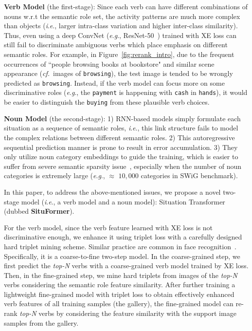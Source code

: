 \documentclass[letterpaper]{article} %
\newcommand{\ie}{\textit{i}.\textit{e}.}
\newcommand{\eg}{\textit{e}.\textit{g}.}
\newcommand{\cf}{\textit{cf.}}
\begin{document}
\noindent\textbf{Verb Model} (the first-stage): Since each verb can have different combinations of nouns w.r.t the semantic role set, the activity patterns are much more complex than objects (\ie, larger intra-class variation and higher inter-class similarity). Thus, even using a deep ConvNet  (\eg, ResNet-50~\cite{he2016deep}) trained with XE loss can still fail to discriminate ambiguous verbs which place emphasis on different semantic roles. For example, in Figure~\ref{fig:rerank_intro}, due to the frequent occurrences of ``people browsing books at bookstore" and similar scene appearance (\cf~images of \texttt{browsing}), the test image is tended to be wrongly predicted as \texttt{browsing}. Instead, if the verb model can focus more on some discriminative roles (\eg, the \texttt{payment} is happening with \texttt{cash} in \texttt{hands}), it would be easier to distinguish the \texttt{buying} from these plausible verb choices.













\noindent\textbf{Noun Model} (the second-stage): 1) RNN-based models simply formulate each situation as a sequence of semantic roles, \ie, this link structure fails to model the complex relations between different semantic roles. 2) This autoregressive sequential prediction manner is prone to result in error accumulation. 3) They only utilize noun category embeddings to guide the training, which is easier to suffer from severe semantic sparsity issue~\cite{yatskar2017commonly}, especially when the number of noun categories is extremely large (\eg, $\approx$ $10,000$ categories in SWiG benchmark).


In this paper, to address the above-mentioned issues, we propose a novel two-stage model (\ie, a verb model and a noun model): Situation Transformer (dubbed \textbf{SituFormer}).

For the verb model, since the verb feature learned with XE loss is not discriminative enough, we enhance it using triplet loss with a carefully designed hard triplet mining scheme. Similar practice are common in face recognition~\cite{schroff2015facenet,wen2016discriminative}. Specifically, it is a coarse-to-fine two-step model. In the coarse-grained step, we first predict the \emph{top-N} verbs with a coarse-grained verb model trained by XE loss. Then, in the fine-grained step, we mine hard triplets from images of the \emph{top-N} verbs considering the semantic role feature similarity. After further training a lightweight fine-grained model with triplet loss to obtain effectively enhanced verb features of all training samples (the gallery), the fine-grained model can re-rank \emph{top-N} verbs by considering the feature similarity with the support image samples from the gallery.
\end{document}
